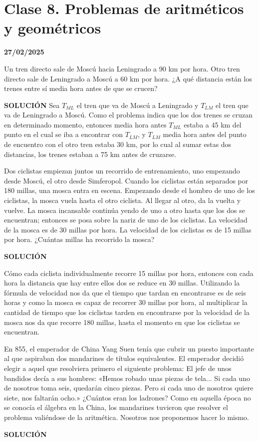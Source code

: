 \section{Clase 8. Problemas de aritméticos y geométricos}
\textbf{27/02/2025}


\begin{excercise}
    Un tren directo sale de Moscú hacia Leningrado a 90 km por hora. Otro tren directo sale de Leningrado a Moscú a 60 km por hora. ¿A qué distancia están los trenes entre sí media hora antes de que se crucen?
\end{excercise}
\textbf{SOLUCIÓN}
Sea $T_{ML}$ el tren que va de Moscú a Leningrado y $T_{LM}$ el tren que va de Leningrado a Moscú.
Como el problema indica que los dos trenes se cruzan en determinado momento, entonces media hora antes $T_{ML}$ estaba a 45 km del punto en el cual se iba a encontrar con $T_{LM}$, y $T_{LM}$ media hora antes del punto de encuentro con el otro tren estaba 30 km, por lo cual al sumar estas dos distancias, los trenes estaban a 75 km antes de cruzarse. 

\begin{excercise}
    Dos ciclistas empiezan juntos un recorrido de entrenamiento, uno empezando desde Moscú, el otro desde Simferopol. Cuando los ciclistas están separados por 180 millas, una mosca entra en escena. Empezando desde el hombro de uno de los ciclistas, la mosca vuela hasta el otro ciclista. Al llegar al otro, da la vuelta y vuelve. La mosca incansable continúa yendo de uno a otro hasta que los dos se encuentran; entonces se posa sobre la nariz de uno de los ciclistas.
    La velocidad de la mosca es de 30 millas por hora. La velocidad de los ciclistas es de 15 millas por hora. ¿Cuántas millas ha recorrido la mosca?
\end{excercise}
\textbf{SOLUCIÓN}

Cómo cada ciclista individualmente recorre 15 millas por hora, entonces con cada hora la distancia que hay entre ellos dos se reduce en 30 millas. Utilizando la fórmula de velocidad nos da que el tiempo que tardan en encontrarse es de seis horas y como la mosca es capaz de recorrer 30 millas por hora, al multiplicar la cantidad de tiempo que los ciclistas tarden en encontrarse por la velocidad de la mosca nos da que recorre 180 millas, hasta el momento en que los ciclistas se encuentran.

\begin{excercise}
    En 855, el emperador de China Yang Suen tenía que cubrir un puesto importante al que aspiraban dos mandarines de títulos equivalentes. El emperador decidió elegir a aquel que resolviera primero el siguiente problema:
    El jefe de unos bandidos decía a sus hombres: «Hemos robado unas piezas de tela... Si cada uno de nosotros toma seis, quedarán cinco piezas. Pero si cada uno de nosotros quiere siete, nos faltarán ocho.» ¿Cuántos eran los ladrones?
    Como en aquella época no se conocía el álgebra en la China, los mandarines tuvieron que resolver el problema valiéndose de la aritmética. Nosotros nos proponemos hacer lo mismo.
\end{excercise}
\textbf{SOLUCIÓN}

